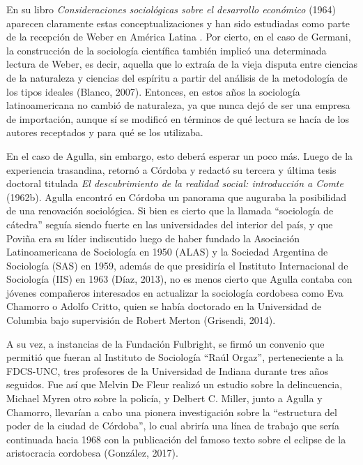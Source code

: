 En su libro \emph{Consideraciones sociológicas sobre el desarrollo económico} (1964) aparecen claramente estas conceptualizaciones y han sido estudiadas como parte de la recepción de Weber en América Latina \parencite{1541-PEON1998}. Por cierto, en el caso de Germani, la construcción de la sociología científica también implicó una determinada lectura de Weber, es decir, aquella que lo extraía de la vieja disputa entre ciencias de la naturaleza y ciencias del espíritu a partir del análisis de la metodología de los tipos ideales (Blanco, 2007). Entonces, en estos años la sociología latinoamericana no cambió de naturaleza, ya que nunca dejó de ser una empresa de importación, aunque sí se modificó en términos de qué lectura se hacía de los autores receptados y para qué se los utilizaba.

En el caso de Agulla, sin embargo, esto deberá esperar un poco más. Luego de la experiencia trasandina, retornó a Córdoba y redactó su tercera y última tesis doctoral titulada \emph{El descubrimiento de la realidad social: introducción a Comte} (1962b). Agulla encontró en Córdoba un panorama que auguraba la posibilidad de una renovación sociológica. Si bien es cierto que la llamada \enquote{sociología de cátedra} seguía siendo fuerte en las universidades del interior del país, y que Poviña era su líder indiscutido luego de haber fundado la Asociación Latinoamericana de Sociología en 1950 (ALAS) y la Sociedad Argentina de Sociología (SAS) en 1959, además de que presidiría el Instituto Internacional de Sociología (IIS) en 1963 (Díaz, 2013), no es menos cierto que Agulla contaba con jóvenes compañeros interesados en actualizar la sociología cordobesa como Eva Chamorro o Adolfo Critto, quien se había doctorado en la Universidad de Columbia bajo supervisión de Robert Merton (Grisendi, 2014).

A su vez, a instancias de la Fundación Fulbright, se firmó un convenio que permitió que fueran al Instituto de Sociología \enquote{Raúl Orgaz}, perteneciente a la FDCS-UNC, tres profesores de la Universidad de Indiana durante tres años seguidos. Fue así que Melvin De Fleur realizó un estudio sobre la delincuencia, Michael Myren otro sobre la policía, y Delbert C. Miller, junto a Agulla y Chamorro, llevarían a cabo una pionera investigación sobre la \enquote{estructura del poder de la ciudad de Córdoba}, lo cual abriría una línea de trabajo que sería continuada hacia 1968 con la publicación del famoso texto sobre el eclipse de la aristocracia cordobesa (González, 2017).

